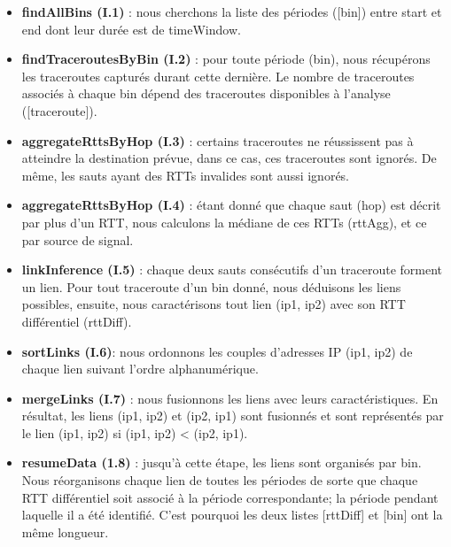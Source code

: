  \begin{itemize}
 	\item \textbf{findAllBins (I.1)} : nous cherchons la liste des périodes {\color{gray}([bin])} entre  {\color{gray}start} et  {\color{gray}end} dont leur
 durée est de  {\color{gray}timeWindow}.
 \item \textbf{findTraceroutesByBin (I.2)} : pour toute période  ({\color{gray}bin}), nous récupérons les traceroutes
 capturés durant cette dernière. Le nombre de traceroutes associés à chaque {\color{gray}bin} dépend
 des traceroutes disponibles à l'analyse  ({\color{gray}[traceroute]}).
 \item \textbf{aggregateRttsByHop (I.3)} : certains traceroutes ne réussissent pas à atteindre la destination prévue, dans ce cas, ces traceroutes sont ignorés. De même, les sauts ayant des RTTs invalides
 sont aussi ignorés.
 \item \textbf{aggregateRttsByHop (I.4)} : étant donné que chaque saut  ({\color{gray}hop}) est décrit par plus d'un RTT, nous calculons la médiane de ces RTTs  ({\color{gray}rttAgg}), et ce par source de signal.
 \item \textbf{linkInference (I.5)} : chaque deux sauts consécutifs d'un traceroute forment un lien. Pour
 tout traceroute d'un  {\color{gray}bin} donné, nous déduisons les liens possibles, ensuite, nous caractérisons tout lien  {\color{gray}(ip1, ip2)} avec son RTT différentiel  ({\color{gray}rttDiff}).
\item \textbf{sortLinks (I.6)}: nous ordonnons les couples d'adresses IP  {\color{gray}(ip1, ip2)} de chaque lien suivant l'ordre alphanumérique. 
 \item \textbf{mergeLinks (I.7)} : nous fusionnons les liens avec leurs caractéristiques. En résultat, les
 liens (ip1, ip2) et (ip2, ip1) sont fusionnés et sont représentés par le lien (ip1, ip2) si (ip1,
 ip2) < (ip2, ip1).
 \item \textbf{resumeData (1.8)} : jusqu'à cette étape, les liens sont organisés par  {\color{gray}bin}.
 Nous réorganisons chaque lien de toutes les périodes de sorte que chaque RTT différentiel soit associé à la période correspondante; la période pendant laquelle il a été identifié. C'est pourquoi les deux listes  {\color{gray}[rttDiff]} et  {\color{gray}[bin]} ont la même longueur.
 
 
 
 
\end{itemize}

